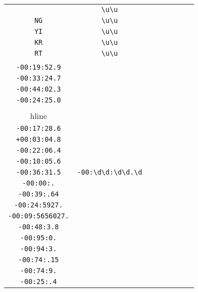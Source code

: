 \begin{longtable}{cccccccc}
\begin{tabular}{ll}
    \verb|AP| & \verb|\u\u|\\
\verb|NG| & \verb|\u\u|\\
\verb|YI| & \verb|\u\u|\\
\verb|KR| & \verb|\u\u|\\
\verb|RT| & \verb|\u\u|
\end{tabular}
\\\midrule 
\begin{tabular}{l}
    \verb|-00:16:05.9|\\
\verb|-00:19:52.9|\\
\verb|-00:33:24.7|\\
\verb|-00:44:02.3|\\
\verb|-00:24:25.0|\\
\\hline\\
\verb|-00:17:28.6|\\
\verb|+00:03:04.8|\\
\verb|-00:22:06.4|\\
\verb|-00:10:05.6|\\
\verb|-00:36:31.5|
\end{tabular}

&
\verb|-00:\d\d:\d\d.\d|
&

\begin{tabular}{l}
    \verb|-00:\d\d:(\d)*\.(\d)*|\\
\verb|-00:00:.|\\
\verb|-00:39:.64|\\
\verb|-00:24:5927.|\\
\verb|-00:09:5656027.|\\
\verb|-00:48:3.8|
\end{tabular}

&

\begin{tabular}{l}
    \verb|-00:\d\d:(\d)*\.(\d)*|\\
\verb|-00:95:0.|\\
\verb|-00:94:3.|\\
\verb|-00:74:.15|\\
\verb|-00:74:9.|\\
\verb|-00:25:.4|
\end{tabular}

&


\end{longtable}
